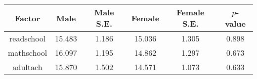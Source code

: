 \begin{longtable}{c c c c c c}
\toprule
\textbf{Factor} & \textbf{Male} & \textbf{Male S.E.}  & \textbf{Female} & \textbf{Female S.E.} & \textbf{$ p $-value} \\
\midrule
readschool & 15.483 & 1.186 &  15.036 & 1.305 & 0.898 \\
mathschool & 16.097 & 1.195 &  14.862 & 1.297 & 0.673 \\
adultach & 15.870 & 1.502 &  14.571 & 1.073 & 0.633 \\
\bottomrule
\end{longtable}
